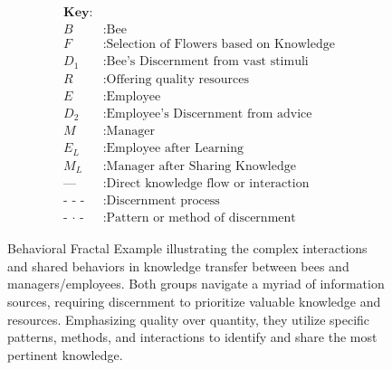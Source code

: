 \documentclass[sn-nature]{sn-jnl}%
\theoremstyle{thmstyleone}%
\theoremstyle{thmstyletwo}%
\theoremstyle{thmstylethree}%
\begin{document}
\begin{figure}[h]
\centering
\begin{minipage}{0.6\textwidth}
\centering
{}
\end{minipage}%
\begin{minipage}{0.4\textwidth}
\begin{align*}
\boxed{
\begin{aligned}
\textbf{Key:} \\
B & : \text{Bee} \\
F & : \text{Selection of Flowers based on Knowledge} \\
D_1 & : \text{Bee's Discernment from vast stimuli} \\
R & : \text{Offering quality resources} \\
E & : \text{Employee} \\
D_2 & : \text{Employee's Discernment from advice} \\
M & : \text{Manager} \\
E_L & : \text{Employee after Learning} \\
M_L & : \text{Manager after Sharing Knowledge} \\
\textbf{---} & : \text{Direct knowledge flow or interaction} \\
\textbf{- - -} & : \text{Discernment process} \\
\textbf{- $\cdot$ -} & : \text{Pattern or method of discernment}
\end{aligned}
}
\end{align*}
\end{minipage}
\caption[Behavioral Fractal Example]{Behavioral Fractal Example illustrating the complex interactions and shared behaviors in knowledge transfer between bees and managers/employees. Both groups navigate a myriad of information sources, requiring discernment to prioritize valuable knowledge and resources\cite{chittka_mind_2022}. Emphasizing quality over quantity, they utilize specific patterns, methods, and interactions to identify and share the most pertinent knowledge.}


\end{figure}
\end{document}
